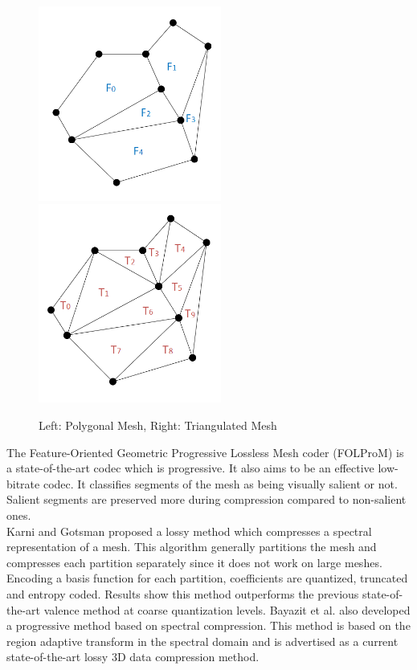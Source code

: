 \begin{figure}[!htb]
\centering
\includegraphics[width=6cm]{images/ch2/PolygonMeshExample}
\includegraphics[width=6cm]{images/ch2/TriangleMeshExample}
\caption{Left: Polygonal Mesh, Right: Triangulated Mesh}
\label{MeshExamples}
\end{figure}


The Feature-Oriented Geometric Progressive Lossless Mesh coder (FOLProM) \cite{Peng10Feature} is a state-of-the-art codec which is progressive. It also aims to be an effective low-bitrate codec. It classifies segments of the mesh as being visually salient or not. Salient segments are preserved more during compression compared to non-salient ones. \\

Karni and Gotsman \cite{Karni00Spectral} proposed a lossy method which compresses a spectral representation of a mesh. This algorithm generally partitions the mesh and compresses each partition separately since it does not work on large meshes. Encoding a basis function for each partition, coefficients are quantized, truncated and entropy coded. Results show this method outperforms the previous state-of-the-art valence method \cite{touma98triangle} at coarse quantization levels. Bayazit et al. \cite{Bayazit103DMesh} also developed a progressive method based on spectral compression. This method is based on the region adaptive transform in the spectral domain and is advertised as a current state-of-the-art lossy 3D data compression method. \\

